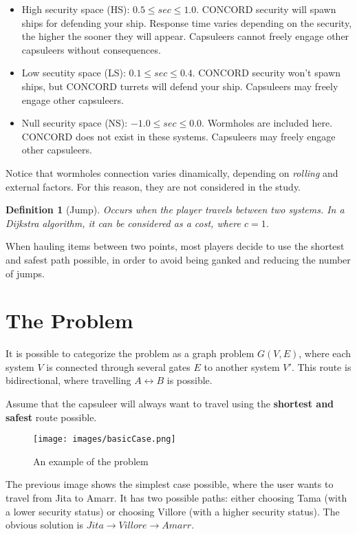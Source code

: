 \documentclass{article}
\theoremstyle{customdef}
\newtheorem{definition}{Definition}
\begin{document}
\begin{itemize}
    \item High security space (HS): $0.5 \leq sec \leq 1.0$. CONCORD security will spawn ships for defending your ship. Response time varies depending on the security, the higher the sooner they will appear. Capsuleers cannot freely engage other capsuleers without consequences.
    \item Low secutity space (LS): $0.1 \leq sec \leq 0.4$. CONCORD security won't spawn ships, but CONCORD turrets will defend your ship. Capsuleers may freely engage other capsuleers.
    \item Null security space (NS): $-1.0 \leq sec \leq 0.0$. Wormholes are included here. CONCORD does not exist in these systems. Capsuleers may freely engage other capsuleers.
\end{itemize}

Notice that wormholes connection varies dinamically, depending on \textit{rolling} and external factors. For this reason, they are not considered in the study.

\begin{definition}[Jump]
Occurs when the player travels between two systems. In a Dijkstra algorithm, it can be considered as a cost, where $c = 1$.
\end{definition}

When hauling items between two points, most players decide to use the shortest and safest path possible, in order to avoid being ganked and reducing the number of jumps.

\section{The Problem}
It is possible to categorize the problem as a graph problem $G(V,E)$, where each system $V$ is connected through several gates $E$ to another system $V'$. This route is bidirectional, where travelling $A \leftrightarrow B$ is possible.

Assume that the capsuleer will always want to travel using the \textbf{shortest and safest} route possible.

\begin{figure}[H]
    \centering
    \texttt{[image: images/basicCase.png]}
    \caption{An example of the problem}
    \label{fig:basicCase}
\end{figure}

The previous image shows the simplest case possible, where the user wants to travel from Jita to Amarr. It has two possible paths: either choosing Tama (with a lower security status) or choosing Villore (with a higher security status). The obvious solution is $Jita \rightarrow Villore \rightarrow Amarr$.
\end{document}
